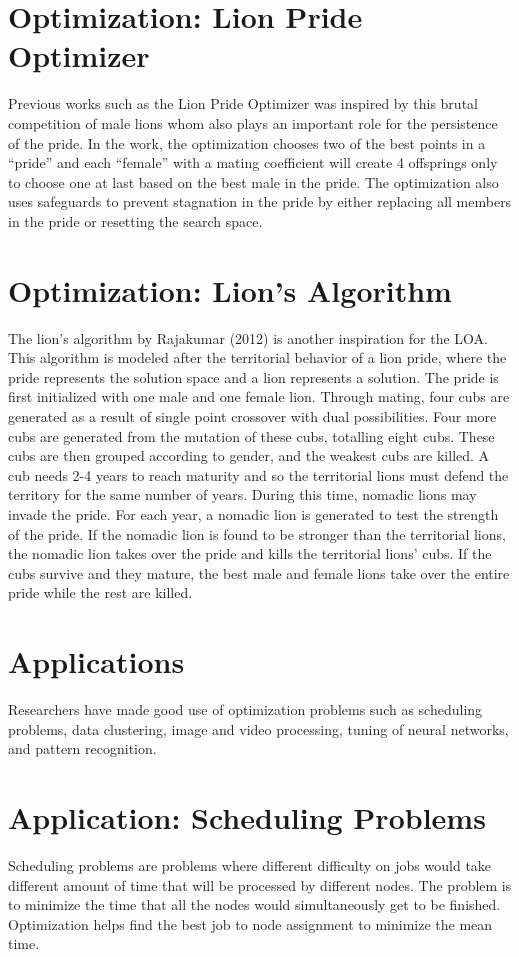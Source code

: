 \section{Optimization: Lion Pride Optimizer}
Previous works such as the Lion Pride Optimizer was inspired by this brutal competition of male lions whom also plays an important role for the persistence of the pride. In the work, the optimization chooses two of the best points in a ``pride'' and each ``female'' with a mating coefficient will create 4 offsprings only to choose one at last based on the best male in the pride. The optimization also uses safeguards to prevent stagnation in the pride by either replacing all members in the pride or resetting the search space.

\section{Optimization: Lion's Algorithm}
The lion's algorithm by Rajakumar (2012) is another inspiration for the LOA. This algorithm is modeled after the territorial behavior of a lion pride, where the pride represents the solution space and a lion represents a solution. The pride is first initialized with one male and one female lion. Through mating, four cubs are generated as a result of single point crossover with dual possibilities. Four more cubs are generated from the mutation of these cubs, totalling eight cubs. These cubs are then grouped according to gender, and the weakest cubs are killed. A cub needs 2-4 years to reach maturity and so the territorial lions must defend the territory for the same number of years. During this time, nomadic lions may invade the pride. For each year, a nomadic lion is generated to test the strength of the pride. If the nomadic lion is found to be stronger than the territorial lions, the nomadic lion takes over the pride and kills the territorial lions' cubs. If the cubs survive and they mature, the best male and female lions take over the entire pride while the rest are killed.

\section{Applications}
Researchers have made good use of optimization problems such as scheduling problems, data clustering, image and video processing, tuning of neural networks, and pattern recognition.

\section{Application: Scheduling Problems}
Scheduling problems are problems where different difficulty on jobs would take different amount of time that will be processed by different nodes. The problem is to minimize the time that all the nodes would simultaneously get to be finished. Optimization helps find the best job to node assignment to minimize the mean time.

